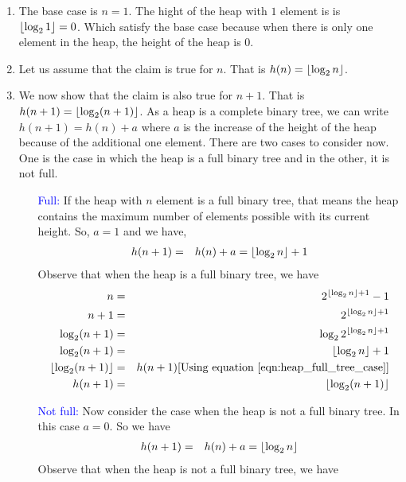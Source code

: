 \documentclass{article}
\DeclarePairedDelimiter\floor{\lfloor}{\rfloor}
\begin{document}
\begin{enumerate}
    \begin{enumerate}
    
    \item The base case is $n = 1$. The hight of the heap with $1$ element is is $\floor{\log_2 1} = 0$. Which satisfy the base case because when there is only one element in the heap, the height of the heap is $0$. 
    \item Let us assume that the claim is true for $n$. That is $h(n) = \floor{\log_2 n }$. 
    \item We now show that the claim is also true for $n+1$. That is $h(n+1) = \floor{\log_2 (n+1) }$. As a heap is a complete binary tree, we can write $h(n+1) = h(n) + a$ where $a$ is the increase of the height of the heap because of the additional one element. There are two cases to consider now. One is the case in which the heap is a full binary tree and in the other, it is not full.
    \begin{enumerate}
    \item[\textcolor{blue}{Full:}]
    If the heap with $n$ element is a full binary tree, that means the heap contains the maximum number of elements possible with its current height. So, $a = 1$ and we have, 
    \begin{eqnarray}
    h(n+1) &=& h(n) + a = \floor{\log_2 n} + 1 \label{eqn:heap_full_tree_case}
    \end{eqnarray}
    Observe that when the heap is a full binary tree, we have
    \begin{eqnarray*}
    n &=& 2^{\floor{\log_2 n}+1}-1\\
    n + 1 &=& 2^{\floor{\log_2 n}+1}\\
    \log_2(n + 1) &=& \log_2 2^{\floor{\log_2 n}+1}\\
    \log_2(n + 1) &=& \floor{\log_2 n}+1\\
    \floor{\log_2(n + 1)} &=& h(n+1) \text{[Using equation \ref{eqn:heap_full_tree_case}]}\\
    h(n+1) &=& \floor{\log_2(n + 1)} 
    \end{eqnarray*}
    \item[\textcolor{blue}{Not full:}]Now consider the case when the heap is not a full binary tree. In this case $a = 0$. So we have 
    \begin{eqnarray}
    h(n+1) &=& h(n) + a = \floor{\log_2 n} \label{eqn:heap_not_full_tree_case}
    \end{eqnarray}
    Observe that when the heap is not a full binary tree, we have
    \begin{eqnarray*}

\end{eqnarray*}
\end{enumerate}
\end{enumerate}
\end{enumerate}
\end{document}
